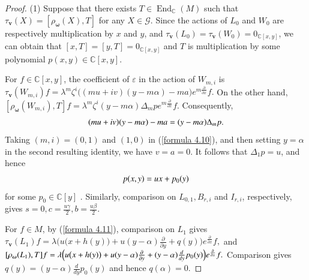 \documentclass[12pt,reqno]{amsart}
\def\M{M}
\def\C{\mathbb{C}}
\numberwithin{equation}{section}
\begin{document}
\begin{proof}
\rm{(1)} Suppose that there exists $T\in \operatorname{End}_{\C}(M)$ such that $\tau_{\boldsymbol{v}}(X)=[\rho_{\boldsymbol{\omega}}(X),T]$ for any $X\in\mathcal{G}$. Since  the actions of $L_0$ and $W_0$ are respectively multiplication by $x$ and $y$, and $\tau_{\boldsymbol{v}}(L_{0})=\tau_{\boldsymbol{v}}(W_{0})=0_{\C[x,y]}$, we can obtain that $[x,T]=[y,T]=0_{\C[x,y]}$ and $T$ is multiplication by some polynomial $p(x,y)\in\C[x,y]$.

For $f\in\C[x,y]$, the coefficient of $\varepsilon$ in the action of $W_{m,i}$ is $\tau_{\boldsymbol{v}}(W_{m,i})f
=\lambda^m\zeta^i
\big((mu+iv)(y-m\alpha)-ma\big)
e^{m\frac{\partial}{\partial{x}}}f.$
On the other hand, $[\rho_{\boldsymbol{\omega}}(W_{m,i}),T]f
=\lambda^m\zeta^i(y-m\alpha)\Delta_mp
e^{m\frac{\partial}{\partial{x}}}f. $
Consequently,
\begin{equation}\label{formula 4.10}
\aligned
(mu+iv)(y-m\alpha)-ma=(y-m\alpha)\Delta_mp.
\endaligned
\end{equation}
Taking $(m,i)=(0,1)$ and $(1,0)$ in (\ref{formula 4.10}), and then setting $y=\alpha$ in the second resulting identity, we have $v=a=0$. It follows that $\Delta_1p=u$, and hence
\begin{equation}\label{formula 4.11}
\aligned
p(x,y)=ux+p_0(y)
\endaligned
\end{equation}
for some $p_0\in\C[y]$ 
. 
Similarly, comparison on $L_{0,1},B_{r,i}$ and $I_{r,i}$, respectively, gives $s=0,c=\frac{u\gamma}{2},b=\frac{u\beta}{2}.$

For $f\in\M$, by (\ref{formula 4.11}), comparison on $L_{1}$ gives $\tau_{\boldsymbol{v}}(L_{1})f
=\lambda\Big(
u\bigl(x+h(y)\bigr)
+u(y-\alpha)\frac{\partial }{\partial y}
+q(y)
\Big)e^{\frac{\partial}{\partial{x}}}f,$
and
$\relax[\rho_{\boldsymbol{\omega}}(L_{1}),T]f
=\lambda\Big(
u\bigl(x+h(y)\bigr)
+u(y-\alpha)\frac{\partial }{\partial y}
+(y-\alpha)\frac{d}{dy}p_0(y)
\Big)e^{\frac{\partial}{\partial{x}}}f.$
Comparison gives $q(y)=(y-\alpha)\frac{d}{dy}p_0(y)$
and hence $q(\alpha)=0$.


\end{proof}
\end{document}
